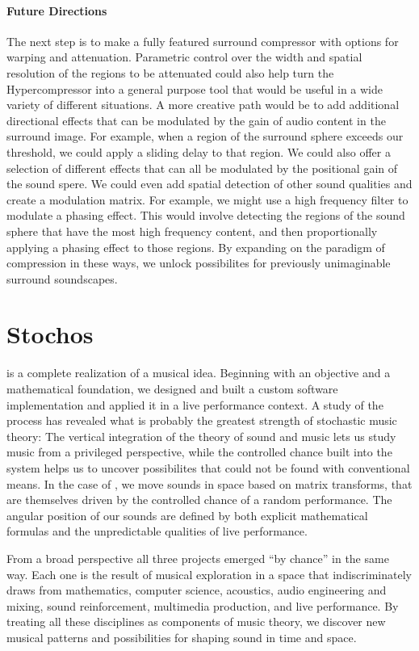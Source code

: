 \paragraph{Future Directions} The next step is to make a fully featured
surround compressor with options for warping and attenuation.
Parametric control over the width and spatial resolution of the
regions to be attenuated could also help turn the Hypercompressor into
a general purpose tool that would be useful in a wide variety of
different situations. A more creative path would be to add additional
directional effects that can be modulated by the gain of audio content
in the surround image. For example, when a region of the surround
sphere exceeds our threshold, we could apply a sliding delay to that
region. We could also offer a selection of different effects that can
all be modulated by the positional gain of the sound spere. We could
even add spatial detection of other sound qualities and create a
modulation matrix. For example, we might use a high frequency filter
to modulate a phasing effect. This would involve detecting the regions
of the sound sphere that have the most high frequency content, and
then proportionally applying a phasing effect to those regions. By
expanding on the paradigm of compression in these ways, we unlock
possibilites for previously unimaginable surround soundscapes.

\section{Stochos}
\thesis is a complete realization of a musical idea. Beginning with an
objective and a mathematical foundation, we designed and built a custom
software implementation and applied it in a live performance
context. A study of the process has revealed what is probably the
greatest strength of stochastic music theory: The vertical integration
of the theory of sound and music lets us study music from a privileged
perspective, while the controlled chance built into the system helps
us to uncover possibilites that could not be found with conventional
means. In the case of \thesis, we move sounds in space based on matrix
transforms, that are themselves driven by the controlled chance of a
random performance. The angular position of our sounds are defined by
both explicit mathematical formulas and the unpredictable qualities of
live performance.

From a broad perspective all three projects emerged ``by chance'' in
the same way. Each one is the result of musical exploration in a space
that indiscriminately draws from mathematics, computer science,
acoustics, audio engineering and mixing, sound reinforcement,
multimedia production, and live performance. By treating all these
disciplines as components of music theory, we discover new musical
patterns and possibilities for shaping sound in time and space.

